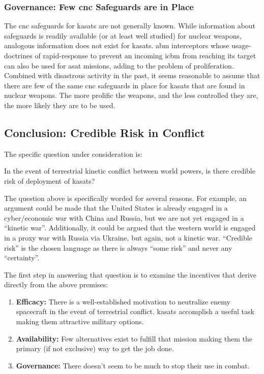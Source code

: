 \subsubsection{Governance: Few \ac{cnc} Safeguards are in Place}
The \ac{cnc} safeguards for \acp{kasat} are not generally known.
While information about safeguards is readily available (or at least
well studied) for nuclear weapons, analogous information does not
exist for \acp{kasat}.  \ac{abm} interceptors whose usage-doctrines of
rapid-response to prevent an incoming \ac{icbm} from reaching its
target can also be used for \ac{asat} missions, adding to the problem
of proliferation.  Combined with disastrous activity in the past, it
seems reasonable to assume that there are few of the same \ac{cnc}
safeguards in place for \acp{kasat} that are found in nuclear weapons.
The more prolific the weapons, and the less controlled they are, the
more likely they are to be used.

\subsection{Conclusion: Credible Risk in Conflict}

The specific question under consideration is:

\begin{blockquote}
  In the event of terrestrial kinetic conflict between world powers,
  is there credible risk of deployment of \acfp{kasat}?
\end{blockquote}

The question above is specifically worded for several reasons.  For
example, an argument could be made that the United States is already
engaged in a cyber/economic war with China and Russia, but we are not
yet engaged in a ``kinetic war''.  Additionally, it could be argued
that the western world is engaged in a proxy war with Russia via
Ukraine, but again, not a kinetic war.  ``Credible risk'' is the
chosen language as there is always ``some risk'' and never any
``certainty''.

The first step in answering that question is to examine the incentives
that derive directly from the above premises:

\begin{enumerate}

\item {\bf Efficacy:} There is a well-established motivation to
  neutralize enemy spacecraft in the event of terrestrial conflict.
  \acfp{kasat} accomplish a useful task making them attractive
  military options.

\item {\bf Availability:} Few alternatives exist to fulfill that
  mission making them the primary (if not exclusive) way to get the
  job done.

\item {\bf Governance:} There doesn't seem to be much to stop their
  use in combat.

\end{enumerate}

